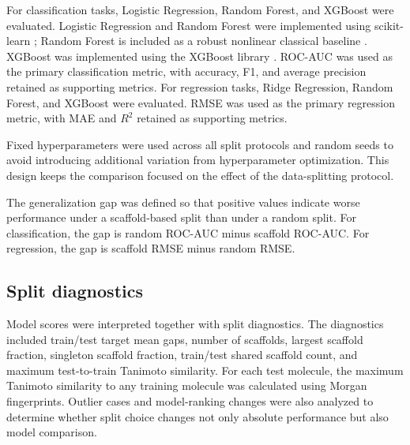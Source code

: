 For classification tasks, Logistic Regression, Random Forest, and XGBoost were evaluated. Logistic Regression and Random Forest were implemented using scikit-learn \citep{pedregosa2011scikit}; Random Forest is included as a robust nonlinear classical baseline \citep{breiman2001random}. XGBoost was implemented using the XGBoost library \citep{chen2016xgboost}. ROC-AUC was used as the primary classification metric, with accuracy, F1, and average precision retained as supporting metrics. For regression tasks, Ridge Regression, Random Forest, and XGBoost were evaluated. RMSE was used as the primary regression metric, with MAE and $R^2$ retained as supporting metrics.

Fixed hyperparameters were used across all split protocols and random seeds to avoid introducing additional variation from hyperparameter optimization. This design keeps the comparison focused on the effect of the data-splitting protocol.

The generalization gap was defined so that positive values indicate worse performance under a scaffold-based split than under a random split. For classification, the gap is random ROC-AUC minus scaffold ROC-AUC. For regression, the gap is scaffold RMSE minus random RMSE.

\subsection{Split diagnostics}

Model scores were interpreted together with split diagnostics. The diagnostics included train/test target mean gaps, number of scaffolds, largest scaffold fraction, singleton scaffold fraction, train/test shared scaffold count, and maximum test-to-train Tanimoto similarity. For each test molecule, the maximum Tanimoto similarity to any training molecule was calculated using Morgan fingerprints. Outlier cases and model-ranking changes were also analyzed to determine whether split choice changes not only absolute performance but also model comparison.
